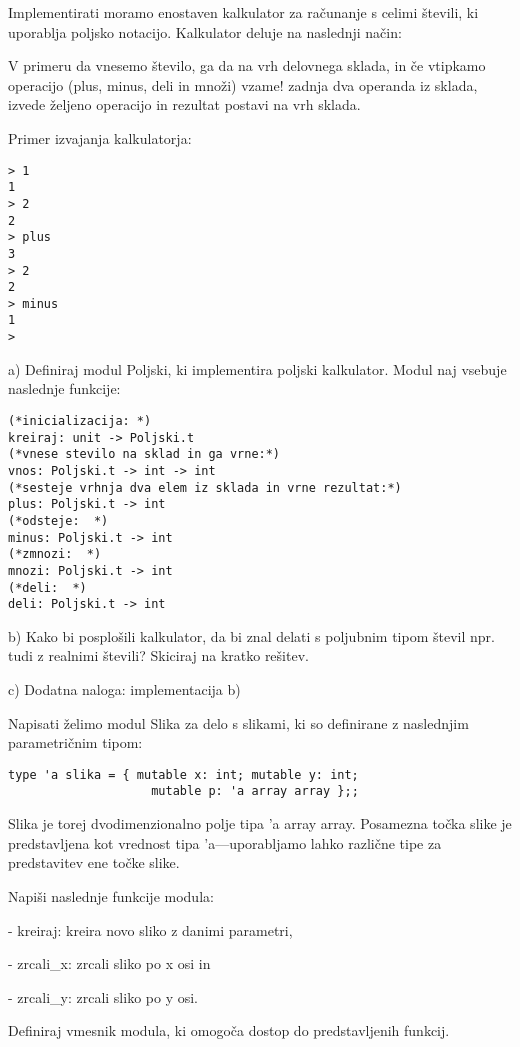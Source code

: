 \begin{ex}
Implementirati moramo enostaven kalkulator za ra\v cunanje s celimi
\v stevili, ki uporablja poljsko notacijo. Kalkulator deluje na naslednji
na\v cin:

V primeru da vnesemo \v stevilo, ga da na vrh delovnega sklada, in \v ce
vtipkamo operacijo (plus, minus, deli in mno\v zi) vzame! zadnja dva
operanda iz sklada, izvede \v zeljeno operacijo in rezultat postavi na
vrh sklada.

Primer izvajanja kalkulatorja: 
\begin{lstlisting}
> 1 
1 
> 2 
2 
> plus 
3 
> 2 
2 
> minus 
1 
> 
\end{lstlisting}

a) Definiraj modul Poljski, ki implementira poljski kalkulator. Modul
naj vsebuje naslednje funkcije:

\begin{lstlisting}
(*inicializacija: *)
kreiraj: unit -> Poljski.t      
(*vnese stevilo na sklad in ga vrne:*)
vnos: Poljski.t -> int -> int   
(*sesteje vrhnja dva elem iz sklada in vrne rezultat:*)
plus: Poljski.t -> int    
(*odsteje:  *)
minus: Poljski.t -> int         
(*zmnozi:  *)
mnozi: Poljski.t -> int         
(*deli:  *)
deli: Poljski.t -> int          
\end{lstlisting}

b) Kako bi posplo\v sili kalkulator, da bi znal delati s poljubnim tipom \v stevil npr. tudi z realnimi \v stevili? Skiciraj na kratko re\v sitev. 

c) Dodatna naloga: implementacija b)  
\end{ex}



\begin{ex}
Napisati \v zelimo modul Slika za delo s slikami, ki so definirane z naslednjim parametri\v cnim tipom:

\begin{lstlisting}
type 'a slika = { mutable x: int; mutable y: int;
					mutable p: 'a array array };; 
\end{lstlisting}

Slika je torej dvodimenzionalno polje tipa 'a array array. Posamezna to\v cka slike je predstavljena kot vrednost tipa 'a---uporabljamo lahko razli\v cne tipe za predstavitev ene to\v cke slike.

Napi\v si naslednje funkcije modula:

- kreiraj: kreira novo sliko z danimi parametri,

- zrcali\_x: zrcali sliko po x osi in

- zrcali\_y: zrcali sliko po y osi.

Definiraj vmesnik modula, ki omogo\v ca dostop do predstavljenih funkcij.
\end{ex}



